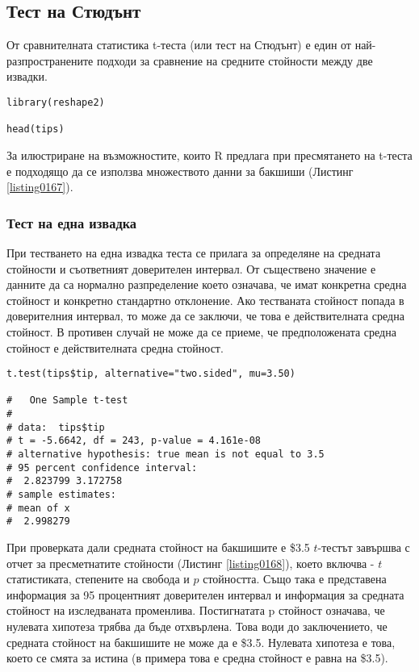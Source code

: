 \subsection{Тест на Стюдънт}

От сравнителната статистика t-теста (или тест на Стюдънт) е един от най-разпространените подходи за сравнение на средните стойности между две извадки. 

\begin{lstlisting}[caption=Тестово множество за бакшиши, label=listing0167]
library(reshape2)

head(tips)
\end{lstlisting}

За илюстриране на възможностите, които R предлага при пресмятането на t-теста е подходящо да се използва множеството данни за бакшиши (Листинг \ref{listing0167}).

\subsubsection{Тест на една извадка}

При тестването на една извадка теста се прилага за определяне на средната стойности и съответният доверителен интервал. От съществено значение е данните да са нормално разпределение което означава, че имат конкретна средна стойност и конкретно стандартно отклонение. Ако тестваната стойност попада в доверителния интервал, то може да се заключи, че това е действителната средна стойност. В противен случай не може да се приеме, че предположената средна стойност е действителната средна стойност. 

\begin{lstlisting}[caption=Тест на единична извадка, label=listing0168]
t.test(tips$tip, alternative="two.sided", mu=3.50)

# 	One Sample t-test
# 
# data:  tips$tip
# t = -5.6642, df = 243, p-value = 4.161e-08
# alternative hypothesis: true mean is not equal to 3.5
# 95 percent confidence interval:
#  2.823799 3.172758
# sample estimates:
# mean of x 
#  2.998279 
\end{lstlisting}

При проверката дали средната стойност на бакшишите е \$3.5 $t$-тестът завършва с отчет за пресметнатите стойности (Листинг \ref{listing0168}), което включва - $t$ статистиката, степените на свобода и $p$ стойността. Също така е представена информация за 95 процентният доверителен интервал и информация за средната стойност на изследваната променлива. Постигнатата p стойност означава, че нулевата хипотеза трябва да бъде отхвърлена. Това води до заключението, че средната стойност на бакшишите не може да е \$3.5. Нулевата хипотеза е това, което се смята за истина (в примера това е средна стойност е равна на \$3.5). 

